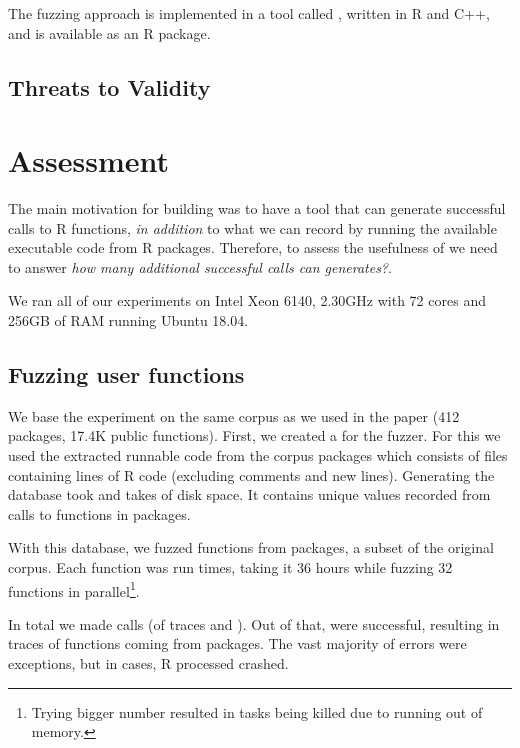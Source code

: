 \documentclass[sigplan,anonymous,review]{acmart}
\begin{document}
The fuzzing approach is implemented in a tool called \tool, written in R and C++, and is available as an R package.

\subsection{Threats to Validity}



\section{Assessment}
\label{sec:assessment}

The main motivation for building \tool was to have a tool that can generate successful calls to R functions, \emph{in addition} to what we can record by running the available executable code from R packages.
Therefore, to assess the usefulness of \tool we need to answer \emph{how many additional successful calls can \tool generates?}.

We ran all of our experiments on Intel Xeon 6140, 2.30GHz with 72 cores and 256GB of RAM running Ubuntu 18.04.

\subsection{Fuzzing user functions}

We base the experiment on the same corpus as we used in the \typer paper (412 packages, 17.4K public functions).
First, we created a \sxpdb for the fuzzer.
For this we used the extracted runnable code from the corpus packages which consists of \DBNumSourceFiles files containing \DBSourceLinesOfCodeRnd lines of R code (excluding comments and new lines).
Generating the database took  and takes \DBFileSize of disk space.
It contains \DBValuesRnd unique values recorded from \DBNumCallsRnd calls to \DBNumFunctionsRnd functions in \DBNumPackages packages.

With this database, we fuzzed \UFNumFunctions functions from \UFNumPackages packages, a subset of the original corpus.
Each function was run \UFTracingBudget times, taking it 36 hours while fuzzing 32 functions in parallel\footnote{Trying bigger number resulted in tasks being killed due to running out of memory.}.

In total we made \UFNumTracesRnd calls (\UFTracesSize of traces and \UFTracesReturnDbsSize). Out of that, \UFRatioSuccessTraces were successful, resulting in \UFNumSuccessTraces traces of \UFNumSuccessFunctions functions coming from \UFNumSuccessPackages packages.
The vast majority of errors were exceptions, but in \UFNumOfCrashedRSessions cases, R processed crashed.
\end{document}

